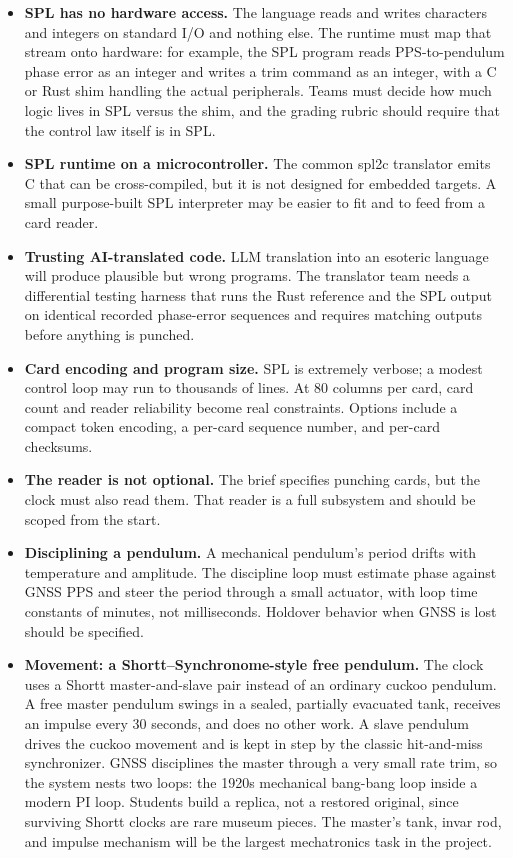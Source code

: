 \documentclass[11pt,letterpaper]{article}
\newcommand{\lead}[1]{\textbf{#1}}
\begin{document}
\begin{itemize}
  \item \lead{SPL has no hardware access.} The language reads and writes characters and
    integers on standard I/O and nothing else. The runtime must map that stream onto
    hardware: for example, the SPL program reads PPS-to-pendulum phase error as an integer
    and writes a trim command as an integer, with a C or Rust shim handling the actual
    peripherals. Teams must decide how much logic lives in SPL versus the shim, and the
    grading rubric should require that the control law itself is in SPL.
  \item \lead{SPL runtime on a microcontroller.} The common spl2c translator emits C that can
    be cross-compiled, but it is not designed for embedded targets. A small purpose-built SPL
    interpreter may be easier to fit and to feed from a card reader.
  \item \lead{Trusting AI-translated code.} LLM translation into an esoteric language will
    produce plausible but wrong programs. The translator team needs a differential testing
    harness that runs the Rust reference and the SPL output on identical recorded phase-error
    sequences and requires matching outputs before anything is punched.
  \item \lead{Card encoding and program size.} SPL is extremely verbose; a modest control loop
    may run to thousands of lines. At 80 columns per card, card count and reader reliability
    become real constraints. Options include a compact token encoding, a per-card sequence
    number, and per-card checksums.
  \item \lead{The reader is not optional.} The brief specifies punching cards, but the clock
    must also read them. That reader is a full subsystem and should be scoped from the start.
  \item \lead{Disciplining a pendulum.} A mechanical pendulum's period drifts with temperature
    and amplitude. The discipline loop must estimate phase against GNSS PPS and steer the
    period through a small actuator, with loop time constants of minutes, not milliseconds.
    Holdover behavior when GNSS is lost should be specified.
  \item \lead{Movement: a Shortt--Synchronome-style free pendulum.} The clock uses a Shortt
    master-and-slave pair instead of an ordinary cuckoo pendulum. A free master pendulum
    swings in a sealed, partially evacuated tank, receives an impulse every 30 seconds, and
    does no other work. A slave pendulum drives the cuckoo movement and is kept in step by the
    classic hit-and-miss synchronizer. GNSS disciplines the master through a very small rate
    trim, so the system nests two loops: the 1920s mechanical bang-bang loop inside a modern
    PI loop. Students build a replica, not a restored original, since surviving Shortt clocks
    are rare museum pieces. The master's tank, invar rod, and impulse mechanism will be the
    largest mechatronics task in the project.
\end{itemize}
\end{document}
